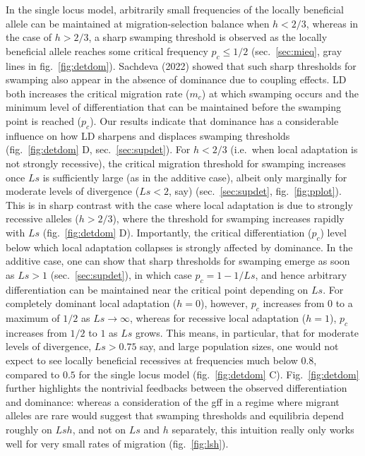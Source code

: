\documentclass[
  11pt,
]{article}
\begin{document}
In the single locus model, arbitrarily small frequencies of the locally
beneficial allele can be maintained at migration-selection balance when
\(h < 2/3\), whereas in the case of \(h > 2/3\), a sharp swamping
threshold is observed as the locally beneficial allele reaches some
critical frequency \(p_c \le 1/2\) (sec.~\ref{sec:mieq}, gray lines in
fig.~\ref{fig:detdom}). Sachdeva (2022) showed that such sharp
thresholds for swamping also appear in the absence of dominance due to
coupling effects. LD both increases the critical migration rate
(\(m_c\)) at which swamping occurs and the minimum level of
differentiation that can be maintained before the swamping point is
reached (\(p_c\)). Our results indicate that dominance has a
considerable influence on how LD sharpens and displaces swamping
thresholds (fig.~\ref{fig:detdom} D, sec.~\ref{sec:supdet}). For
\(h<2/3\) (i.e.~when local adaptation is not strongly recessive), the
critical migration threshold for swamping increases once \(Ls\) is
sufficiently large (as in the additive case), albeit only marginally for
moderate levels of divergence (\(Ls < 2\), say) (sec.~\ref{sec:supdet},
fig.~\ref{fig:pplot}). This is in sharp contrast with the case where
local adaptation is due to strongly recessive alleles (\(h > 2/3\)),
where the threshold for swamping increases rapidly with \(Ls\)
(fig.~\ref{fig:detdom} D). Importantly, the critical differentiation
(\(p_c\)) level below which local adaptation collapses is strongly
affected by dominance. In the additive case, one can show that sharp
thresholds for swamping emerge as soon as \(Ls > 1\)
(sec.~\ref{sec:supdet}), in which case \(p_c = 1-1/Ls\), and hence
arbitrary differentiation can be maintained near the critical point
depending on \(Ls\). For completely dominant local adaptation (\(h=0\)),
however, \(p_c\) increases from \(0\) to a maximum of \(1/2\) as
\(Ls \rightarrow \infty\), whereas for recessive local adaptation
(\(h=1\)), \(p_c\) increases from \(1/2\) to \(1\) as \(Ls\) grows. This
means, in particular, that for moderate levels of divergence,
\(Ls > 0.75\) say, and large population sizes, one would not expect to
see locally beneficial recessives at frequencies much below \(0.8\),
compared to \(0.5\) for the single locus model (fig.~\ref{fig:detdom}
C). Fig.~\ref{fig:detdom} further highlights the nontrivial feedbacks
between the observed differentiation and dominance: whereas a
consideration of the gff in a regime where migrant alleles are rare
would suggest that swamping thresholds and equilibria depend roughly on
\(Lsh\), and not on \(Ls\) and \(h\) separately, this intuition really
only works well for very small rates of migration (fig.~\ref{fig:lsh}).
\end{document}
